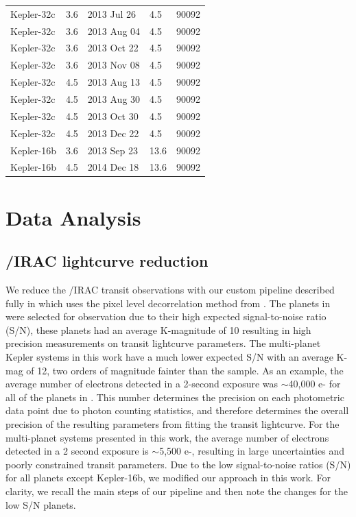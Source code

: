 {\begin{longtable}[h]{lllll}
Kepler-32c &               3.6 &   2013 Jul 26 &         4.5 &       90092 \\
Kepler-32c &               3.6 &   2013 Aug 04 &         4.5 &       90092 \\
Kepler-32c &               3.6 &   2013 Oct 22 &         4.5 &       90092 \\
Kepler-32c &               3.6 &   2013 Nov 08 &         4.5 &       90092 \\

Kepler-32c &               4.5 &   2013 Aug 13 &         4.5 &       90092 \\
Kepler-32c &               4.5 &   2013 Aug 30 &         4.5 &       90092 \\
Kepler-32c &               4.5 &   2013 Oct 30 &         4.5 &       90092 \\
Kepler-32c &               4.5 &   2013 Dec 22 &         4.5 &       90092 \\

Kepler-16b &               3.6 &   2013 Sep 23 &        13.6 &       90092 \\
Kepler-16b &               4.5 &   2014 Dec 18 &        13.6 &       90092 \\
\end{longtable}
}

\section{Data Analysis}
\label{P4:sec:analysis}
\subsection{\spitzer/IRAC lightcurve reduction}

We reduce the \spitzer/IRAC transit observations with our custom pipeline described fully in \citet{Baxter2021} which uses the pixel level decorrelation method from \citep{Deming2015}. The planets in \citet{Baxter2021} were selected for observation due to their high expected signal-to-noise ratio (S/N), these planets had an average K-magnitude of 10 resulting in high precision measurements on transit lightcurve parameters. The multi-planet Kepler systems in this work have a much lower expected S/N with an average K-mag of 12, two orders of magnitude fainter than the \citet{Baxter2021} sample. As an example, the average number of electrons detected in a 2-second exposure was $\sim$40,000 e- for all of the planets in \citet{Baxter2021}. This number determines the precision on each photometric data point due to photon counting statistics, and therefore determines the overall precision of the resulting parameters from fitting the transit lightcurve. For the multi-planet systems presented in this work, the average number of electrons detected in a 2 second exposure is $\sim$5,500 e-, resulting in large uncertainties and poorly constrained transit parameters. Due to the low signal-to-noise ratios (S/N) for all planets except Kepler-16b, we modified our approach in this work. For clarity, we recall the main steps of our pipeline and then note the changes for the low S/N planets.

